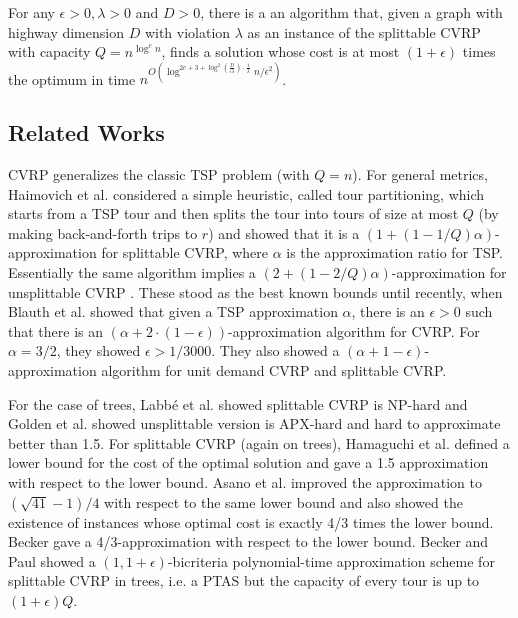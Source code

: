 \documentclass[twoside,leqno]{article}
\newcommand{\eps}{\epsilon}
\begin{document}
\begin{theorem}\label{thm:HD}
For any $\eps > 0, \lambda > 0$ and $D > 0$, there is a an algorithm that, given a graph with highway dimension $D$ with violation $\lambda$ as an instance of the splittable CVRP with capacity $Q = n^{\log^c n}$, finds a solution whose cost is at most $(1 + \eps)$ times the optimum in time $n^{O( \log^{2c + 3 + \log^2(\frac{D}{\eps \lambda})\cdot \frac{1}{\lambda}}n/\eps^2)}$.
\end{theorem}

\subsection{Related Works}
CVRP generalizes the classic TSP problem (with $Q=n$).
For general metrics, Haimovich et al. \cite{Haimovich-Kan} considered a simple heuristic, called tour partitioning, which starts from a TSP tour and then splits the tour into tours of size at most $Q$ (by making back-and-forth trips to $r$) and showed that it is a $(1 + (1 - 1/Q)\alpha)$-approximation for splittable CVRP, where $\alpha$ is the approximation ratio for TSP. Essentially the same algorithm implies a $(2 + (1 - 2/Q)\alpha)$-approximation for unsplittable CVRP \cite{ALTINKEMER1987149}. These stood as the best known bounds until recently, when Blauth et al. \cite{Vygen} showed that given a TSP approximation $\alpha$, there is an $\eps > 0$ such that there is an $(\alpha + 2 \cdot (1 - \eps))$-approximation algorithm for CVRP. For $\alpha = 3/2$, they showed $\eps > 1/3000$. They also showed a $(\alpha + 1 - \eps)$-approximation algorithm for unit demand CVRP and splittable CVRP. 

For the case of trees, Labbé et al. \cite{Labbe-Mercure} showed splittable CVRP is NP-hard and Golden et al. \cite{Golden-Wong} showed unsplittable version is APX-hard and hard to approximate better than 1.5. For splittable CVRP (again on trees), Hamaguchi et al. \cite{Hamaguchi-Katoh} defined a lower bound for the cost of the optimal solution and gave a 1.5 approximation with respect to the lower bound. Asano et al. \cite{stoc/AsanoKTT97} improved the approximation to $(\sqrt{41} - 1)/4$ with respect to the same lower bound and also showed the existence of instances whose optimal cost is exactly 4/3 times the lower bound. Becker \cite{Becker18} gave a 4/3-approximation with respect to the  lower bound. Becker and Paul \cite{Becker-Paul-Bricriteria} showed a $(1, 1+ \eps)$-bicriteria polynomial-time approximation scheme for splittable CVRP in trees, i.e. a PTAS but the capacity of every tour is up to $(1+\eps)Q$.
\end{document}
